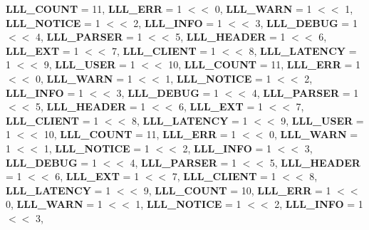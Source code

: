 \begin{DoxyCompactItemize}
{\bfseries L\+L\+L\+\_\+\+C\+O\+U\+NT} = 11, 
{\bfseries L\+L\+L\+\_\+\+E\+RR} = 1 $<$$<$ 0, 
\newline
{\bfseries L\+L\+L\+\_\+\+W\+A\+RN} = 1 $<$$<$ 1, 
{\bfseries L\+L\+L\+\_\+\+N\+O\+T\+I\+CE} = 1 $<$$<$ 2, 
{\bfseries L\+L\+L\+\_\+\+I\+N\+FO} = 1 $<$$<$ 3, 
{\bfseries L\+L\+L\+\_\+\+D\+E\+B\+UG} = 1 $<$$<$ 4, 
\newline
{\bfseries L\+L\+L\+\_\+\+P\+A\+R\+S\+ER} = 1 $<$$<$ 5, 
{\bfseries L\+L\+L\+\_\+\+H\+E\+A\+D\+ER} = 1 $<$$<$ 6, 
{\bfseries L\+L\+L\+\_\+\+E\+XT} = 1 $<$$<$ 7, 
{\bfseries L\+L\+L\+\_\+\+C\+L\+I\+E\+NT} = 1 $<$$<$ 8, 
\newline
{\bfseries L\+L\+L\+\_\+\+L\+A\+T\+E\+N\+CY} = 1 $<$$<$ 9, 
{\bfseries L\+L\+L\+\_\+\+U\+S\+ER} = 1 $<$$<$ 10, 
{\bfseries L\+L\+L\+\_\+\+C\+O\+U\+NT} = 11, 
{\bfseries L\+L\+L\+\_\+\+E\+RR} = 1 $<$$<$ 0, 
\newline
{\bfseries L\+L\+L\+\_\+\+W\+A\+RN} = 1 $<$$<$ 1, 
{\bfseries L\+L\+L\+\_\+\+N\+O\+T\+I\+CE} = 1 $<$$<$ 2, 
{\bfseries L\+L\+L\+\_\+\+I\+N\+FO} = 1 $<$$<$ 3, 
{\bfseries L\+L\+L\+\_\+\+D\+E\+B\+UG} = 1 $<$$<$ 4, 
\newline
{\bfseries L\+L\+L\+\_\+\+P\+A\+R\+S\+ER} = 1 $<$$<$ 5, 
{\bfseries L\+L\+L\+\_\+\+H\+E\+A\+D\+ER} = 1 $<$$<$ 6, 
{\bfseries L\+L\+L\+\_\+\+E\+XT} = 1 $<$$<$ 7, 
{\bfseries L\+L\+L\+\_\+\+C\+L\+I\+E\+NT} = 1 $<$$<$ 8, 
\newline
{\bfseries L\+L\+L\+\_\+\+L\+A\+T\+E\+N\+CY} = 1 $<$$<$ 9, 
{\bfseries L\+L\+L\+\_\+\+U\+S\+ER} = 1 $<$$<$ 10, 
{\bfseries L\+L\+L\+\_\+\+C\+O\+U\+NT} = 11, 
{\bfseries L\+L\+L\+\_\+\+E\+RR} = 1 $<$$<$ 0, 
\newline
{\bfseries L\+L\+L\+\_\+\+W\+A\+RN} = 1 $<$$<$ 1, 
{\bfseries L\+L\+L\+\_\+\+N\+O\+T\+I\+CE} = 1 $<$$<$ 2, 
{\bfseries L\+L\+L\+\_\+\+I\+N\+FO} = 1 $<$$<$ 3, 
{\bfseries L\+L\+L\+\_\+\+D\+E\+B\+UG} = 1 $<$$<$ 4, 
\newline
{\bfseries L\+L\+L\+\_\+\+P\+A\+R\+S\+ER} = 1 $<$$<$ 5, 
{\bfseries L\+L\+L\+\_\+\+H\+E\+A\+D\+ER} = 1 $<$$<$ 6, 
{\bfseries L\+L\+L\+\_\+\+E\+XT} = 1 $<$$<$ 7, 
{\bfseries L\+L\+L\+\_\+\+C\+L\+I\+E\+NT} = 1 $<$$<$ 8, 
\newline
{\bfseries L\+L\+L\+\_\+\+L\+A\+T\+E\+N\+CY} = 1 $<$$<$ 9, 
{\bfseries L\+L\+L\+\_\+\+C\+O\+U\+NT} = 10, 
{\bfseries L\+L\+L\+\_\+\+E\+RR} = 1 $<$$<$ 0, 
{\bfseries L\+L\+L\+\_\+\+W\+A\+RN} = 1 $<$$<$ 1, 
\newline
{\bfseries L\+L\+L\+\_\+\+N\+O\+T\+I\+CE} = 1 $<$$<$ 2, 
{\bfseries L\+L\+L\+\_\+\+I\+N\+FO} = 1 $<$$<$ 3, 

\end{DoxyCompactItemize}

